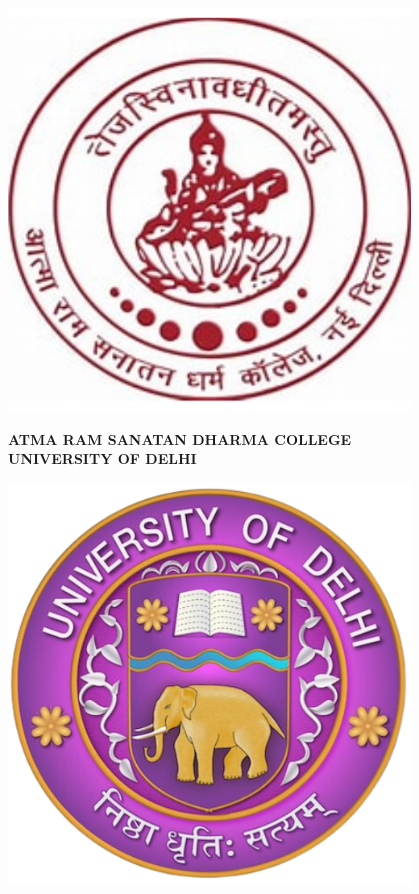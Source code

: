 \begin{titlepage}
    \centering
    \begin{minipage}{0.24\textwidth}
        \centering
        \includegraphics[width=0.8\textwidth]{miscellaneous/arsd_logo.png} %
    \end{minipage}%
    \hfill
    \begin{minipage}{0.5\textwidth}
        \centering
        {\large \textbf{ATMA RAM SANATAN DHARMA COLLEGE}} \\
        \vspace{0.1cm}
        {\large \textbf{UNIVERSITY OF DELHI}} 
    \end{minipage}%
    \hfill
    \begin{minipage}{0.24\textwidth}
        \centering
        \includegraphics[width=0.8\textwidth]{miscellaneous/du_logo.png} %
    \end{minipage}


\end{titlepage}
